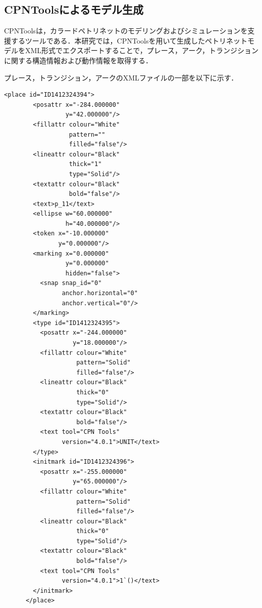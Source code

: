 \subsection{CPNToolsによるモデル生成}
CPNToolsは，カラードペトリネットのモデリングおよびシミュレーションを支援するツールである．本研究では，CPNToolsを用いて生成したペトリネットモデルをXML形式でエクスポートすることで，プレース，アーク，トランジションに関する構造情報および動作情報を取得する．

プレース，トランジション，アークのXMLファイルの一部を以下に示す．

\begin{lstlisting}[caption=プレースのXMLファイル,label=cpn_place]
<place id="ID1412324394">
        <posattr x="-284.000000"
                 y="42.000000"/>
        <fillattr colour="White"
                  pattern=""
                  filled="false"/>
        <lineattr colour="Black"
                  thick="1"
                  type="Solid"/>
        <textattr colour="Black"
                  bold="false"/>
        <text>p_11</text>
        <ellipse w="60.000000"
                 h="40.000000"/>
        <token x="-10.000000"
               y="0.000000"/>
        <marking x="0.000000"
                 y="0.000000"
                 hidden="false">
          <snap snap_id="0"
                anchor.horizontal="0"
                anchor.vertical="0"/>
        </marking>
        <type id="ID1412324395">
          <posattr x="-244.000000"
                   y="18.000000"/>
          <fillattr colour="White"
                    pattern="Solid"
                    filled="false"/>
          <lineattr colour="Black"
                    thick="0"
                    type="Solid"/>
          <textattr colour="Black"
                    bold="false"/>
          <text tool="CPN Tools"
                version="4.0.1">UNIT</text>
        </type>
        <initmark id="ID1412324396">
          <posattr x="-255.000000"
                   y="65.000000"/>
          <fillattr colour="White"
                    pattern="Solid"
                    filled="false"/>
          <lineattr colour="Black"
                    thick="0"
                    type="Solid"/>
          <textattr colour="Black"
                    bold="false"/>
          <text tool="CPN Tools"
                version="4.0.1">1`()</text>
        </initmark>
      </place>
\end{lstlisting}


